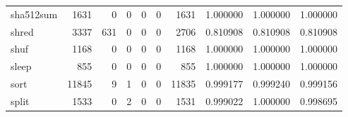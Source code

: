 \begin{longtable}{lrrrrrrrrr}
sha512sum &                                1631 &                                               0 &                                              0 &                                             0 &                                              0 &                                         1631 &                                           1.000000 &                               1.000000 &                             1.000000 \\
shred     &                                3337 &                                             631 &                                              0 &                                             0 &                                              0 &                                         2706 &                                           0.810908 &                               0.810908 &                             0.810908 \\
shuf      &                                1168 &                                               0 &                                              0 &                                             0 &                                              0 &                                         1168 &                                           1.000000 &                               1.000000 &                             1.000000 \\
sleep     &                                 855 &                                               0 &                                              0 &                                             0 &                                              0 &                                          855 &                                           1.000000 &                               1.000000 &                             1.000000 \\
sort      &                               11845 &                                               9 &                                              1 &                                             0 &                                              0 &                                        11835 &                                           0.999177 &                               0.999240 &                             0.999156 \\
split     &                                1533 &                                               0 &                                              2 &                                             0 &                                              0 &                                         1531 &                                           0.999022 &                               1.000000 &                             0.998695 \\

\end{longtable}
